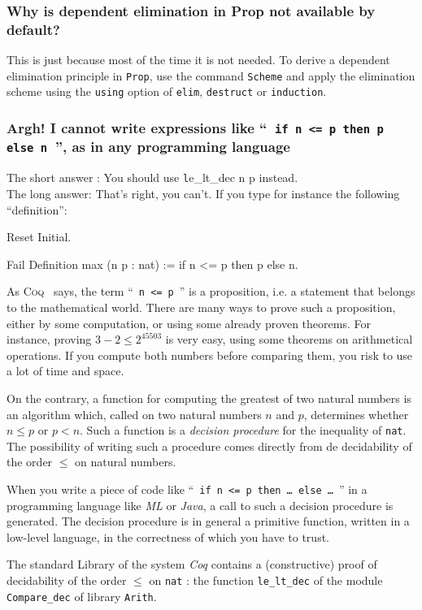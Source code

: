 \documentclass[a4paper,pdftex]{article}
\def\Question#1{\stepcounter{question}\subsubsection{#1}}
\def\Coq{\textsc{Coq}}
\begin{document}
\Question{Why is dependent elimination in Prop not
available by default?}

 
This is just because most of the time it is not needed. To derive a
dependent elimination principle in {\tt Prop}, use the command {\tt Scheme} and
apply the elimination scheme using the \verb=using= option of
\verb=elim=, \verb=destruct= or \verb=induction=.


\Question{Argh! I cannot write expressions like ``~{\tt if n <= p then p else n}~'', as in any programming language}
\label{minmax}

The short answer : You should use {\texttt le\_lt\_dec n p} instead.\\

The long answer: That's right, you can't.
If you type for instance the following ``definition'':
\begin{coq_eval}
Reset Initial.
\end{coq_eval}
\begin{coq_example}
Fail Definition max (n p : nat) := if n <= p then p else n.
\end{coq_example}

As \Coq~ says, the term ``~\texttt{n <= p}~'' is a proposition, i.e. a
statement that belongs to the mathematical world. There are many ways to
prove such a proposition, either by some computation, or using some already
proven theorems. For instance, proving $3-2 \leq 2^{45503}$ is very easy,
using some theorems on arithmetical operations. If you compute both numbers
before comparing them, you risk to use a lot of time and space.


On the contrary, a function for computing the greatest of two natural numbers
is an algorithm  which, called on two natural numbers
$n$ and $p$, determines whether $n\leq p$ or $p < n$.
Such a function is a \emph{decision  procedure} for the inequality of
 \texttt{nat}.  The possibility of writing such a procedure comes 
directly from de decidability of the order $\leq$ on natural numbers.


When you write a piece of code like 
``~\texttt{if n <= p then \dots{} else \dots}~''
in a
programming language like \emph{ML} or \emph{Java}, a call to such a 
decision procedure is generated. The decision procedure is in general
a primitive function, written in a low-level language, in the correctness
of which you have to trust.

The standard Library of the system \emph{Coq} contains a  
(constructive) proof of decidability of the order $\leq$ on
\texttt{nat} : the function \texttt{le\_lt\_dec} of 
the module \texttt{Compare\_dec} of library \texttt{Arith}.
\end{document}
